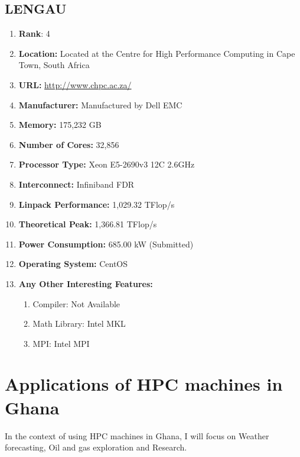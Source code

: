 \documentclass[12pt, a4paper, fleqn, titlepage]{article}
\begin{document}
    \subsection{LENGAU}
        \begin{flushleft}
            \begin{enumerate}[\textbullet]
                \item \textbf{Rank}: 4
                \item \textbf{Location:} 
                    Located at the Centre for High Performance Computing in Cape Town, South Africa
                \item \textbf{URL:} 
                    \url{http://www.chpc.ac.za/}
                \item \textbf{Manufacturer:} Manufactured by Dell EMC
                \item \textbf{Memory:} 175,232 GB
                \item \textbf{Number of Cores:} 32,856
                \item \textbf{Processor Type:} Xeon E5-2690v3 12C 2.6GHz
                \item \textbf{Interconnect:} Infiniband FDR
                \item \textbf{Linpack Performance:} 1,029.32  TFlop/s
                \item \textbf{Theoretical Peak:} 1,366.81  TFlop/s
                \item \textbf{Power Consumption:} 685.00  kW (Submitted)
                \item \textbf{Operating System:} CentOS
                \item \textbf{Any Other Interesting Features:}
                    \begin{enumerate}
                        \item Compiler: Not Available
                        \item Math Library: Intel MKL
                        \item MPI: Intel MPI
                    \end{enumerate}
            \end{enumerate}
        \end{flushleft}
\section{Applications of HPC machines in Ghana}
    
        In the context of using HPC machines in Ghana, I will focus on Weather forecasting, Oil and gas exploration and Research. 
\end{document}
